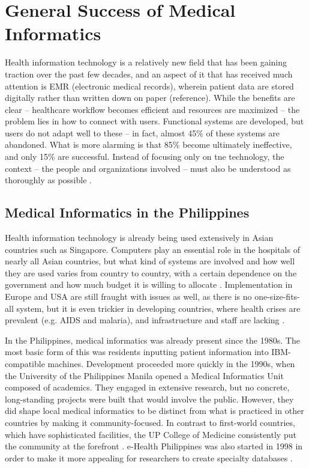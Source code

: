 \section{General Success of Medical Informatics}

Health information technology is a relatively new field that has been gaining traction over the past few decades, and an aspect of it that has received much attention is EMR (electronic medical records), wherein patient data are stored digitally rather than written down on paper (reference). While the benefits are clear -- healthcare workflow becomes efficient and resources are maximized -- the problem lies in how to connect with users. Functional systems are developed, but users do not adapt well to these -- in fact, almost 45\% of these systems are abandoned. What is more alarming is that 85\% become ultimately ineffective, and only 15\% are successful. Instead of focusing only on tne technology, the context -- the people and organizations involved -- must also be understood as thoroughly as possible \cite{premji2012implementing}.

\subsection{Medical Informatics in the Philippines}

Health information technology is already being used extensively in Asian countries such as Singapore. Computers play an essential role in the hospitals of nearly all Asian countries, but what kind of systems are involved and how well they are used varies from country to country, with a certain dependence on the government and how much budget it is willing to allocate \cite{nguyen2008analysis}. Implementation in Europe and USA are still fraught with issues as well, as there is no one-size-fits-all system, but it is even trickier in developing countries, where health crises are prevalent (e.g. AIDS and malaria), and infrastructure and staff are lacking \cite{fraser2005implementing}.

In the Philippines, medical informatics was already present since the 1980s. The most basic form of this was residents inputting patient information into IBM-compatible machines. Development proceeded more quickly in the 1990s, when the University of the Philippines Manila opened a Medical Informatics Unit composed of academics. They engaged in extensive research, but no concrete, long-standing projects were built that would involve the public. However, they did shape local medical informatics to be distinct from what is practiced in other countries by making it community-focused. In contrast to first-world countries, which have sophisticated facilities, the UP College of Medicine consistently put the community at the forefront \cite{marcelo2007health}. e-Health Philippines was also started in 1998 in order to make it more appealing for researchers to create specialty databases \cite{nguyen2008analysis}.

